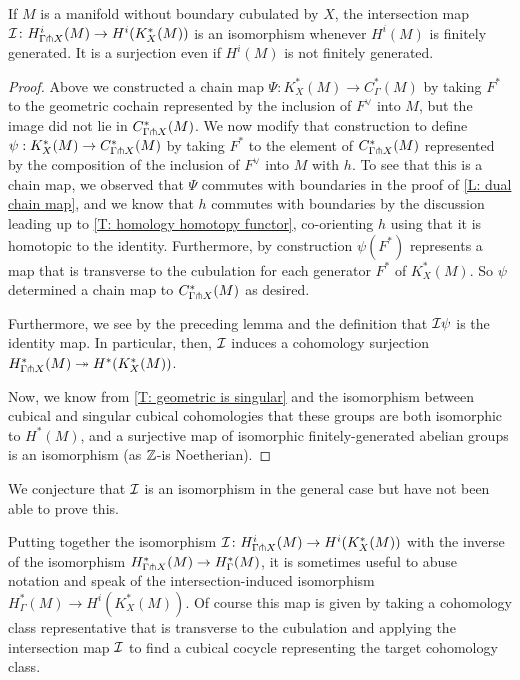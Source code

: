 \begin{theorem}\label{T: intersection qi}
	If $M$ is a manifold without boundary cubulated by $X$, the intersection map $\mathcal{I} \colon H^i_{\Gamma \pitchfork X}(M) \to H^i(K_X^*(M))$ is an isomorphism whenever $H^i(M)$ is finitely generated.
	It is a surjection even if $H^i(M)$ is not finitely generated.
\end{theorem}

\begin{proof}
	Above we constructed a chain map $\Psi \colon K_X^*(M) \to C_\Gamma^*(M)$ by taking $F^*$ to the geometric cochain represented by the inclusion of $F^\vee$ into $M$, but the image did not lie in $C^*_{\Gamma \pitchfork X}(M)$.
	We now modify that construction to define $\psi:K_X^*(M) \to C_{\Gamma \pitchfork X}^*(M)$ by taking $F^*$ to the element of $C^*_{\Gamma \pitchfork X}(M)$ represented by the composition of the inclusion of $F^\vee$ into $M$ with $h$.
	To see that this is a chain map, we observed that $\Psi$ commutes with boundaries in the proof of \cref{L: dual chain map}, and we know that $h$ commutes with boundaries by the discussion leading up to \cref{T: homology homotopy functor}, co-orienting $h$ using that it is homotopic to the identity.
	Furthermore, by construction $\psi(F^*)$ represents a map that is transverse to the cubulation for each generator $F^*$ of $K_X^*(M)$.
	So $\psi$ determined a chain map to $C_{\Gamma \pitchfork X}^*(M)$ as desired.

	Furthermore, we see by the preceding lemma and the definition that $\mathcal{I}\psi$ is the identity map.
	In particular, then, $\mathcal{I}$ induces a cohomology surjection $H^*_{\Gamma \pitchfork X}(M)\twoheadrightarrow H^*(K_X^*(M))$.

	Now, we know from \cref{T: geometric is singular} and the isomorphism between cubical and singular cubical cohomologies that these groups are both isomorphic to $H^*(M)$, and a surjective map of isomorphic finitely-generated abelian groups is an isomorphism (as $\mathbb{Z}$-is Noetherian).
\end{proof}

We conjecture that $\mathcal{I}$ is an isomorphism in the general case but have not been able to prove this.

\begin{remark}\label{R: intersection map extension}
	Putting together the isomorphism $\mathcal{I} \colon H^i_{\Gamma \pitchfork X}(M) \to H^i(K_X^*(M))$ with the inverse of the isomorphism $H^*_{\Gamma \pitchfork X}(M) \to H^*_\Gamma(M)$, it is sometimes useful to abuse notation and speak of the intersection-induced isomorphism
	$H^*_\Gamma(M) \to H^i(K_X^*(M))$.
	Of course this map is given by taking a cohomology class representative that is transverse to the cubulation and applying the intersection map $\mathcal{I}$ to find a cubical cocycle representing the target cohomology class.
\end{remark}